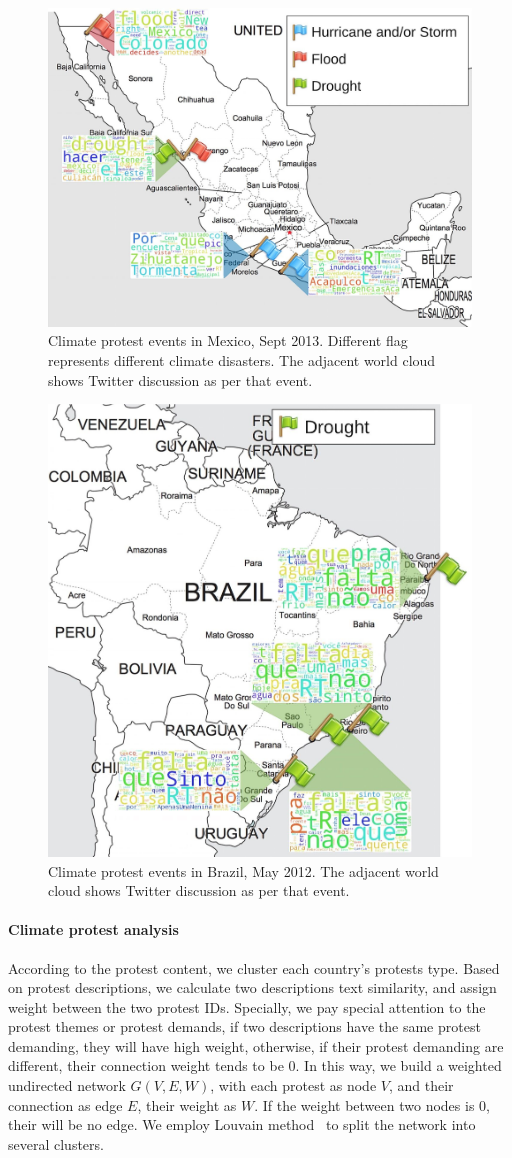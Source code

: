 \documentclass[9pt,twocolumn,twoside]{pnas-new}
\begin{document}
\begin{figure}[ht]
\centerline
{\includegraphics[width=.3\textwidth]{figures/Mexico-events}}
\caption{Climate protest events in Mexico, Sept 2013. Different flag represents different climate disasters. The adjacent world cloud shows Twitter discussion as per that event.}
\label{Mexico-events}
\end{figure}



\begin{figure}[ht]
\centerline
{\includegraphics[width=.25\textwidth]{figures/Brazil-events}}
\caption{Climate protest events in Brazil, May 2012. The adjacent world cloud shows Twitter discussion as per that event.}
\label{Brazil-events}
\end{figure}



\paragraph{Climate protest analysis}
According to the protest content, we cluster each country's protests type. Based on protest descriptions, we calculate two descriptions text similarity, and assign weight between the two protest IDs. Specially, we pay special attention to the protest themes or protest demands, if two descriptions have the same protest demanding, they will have high weight, otherwise, if their protest demanding are different, their connection weight tends to be 0. In this way, we build a weighted undirected network $G(V, E, W)$, with each protest as node $V$, and their connection as edge $E$, their weight as $W$. If the weight between two nodes is 0, their will be no edge. We employ Louvain method~\cite{blondel2008fast} to split the network into several clusters.
\end{document}
